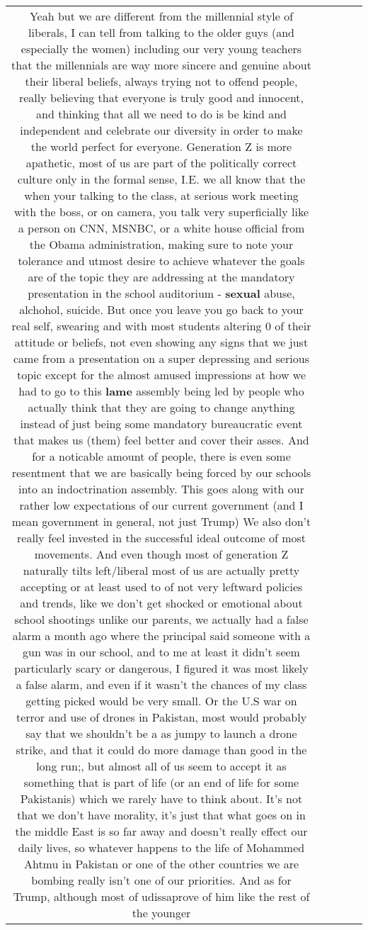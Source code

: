 \documentclass[11pt]{article}
\newlength\mylength
\begin{document}
\begin{center}
\begin{longtable}{|C{.65\mylength}|C{.30\mylength}|C{.12\mylength}|C{.12\mylength}|C{.12\mylength}|}
  \small Yeah but we are different from the millennial style of liberals, I can tell from talking to the older guys (and especially the women) including our very young teachers that the millennials are way more sincere and genuine about their liberal beliefs, always trying not to offend people, really believing that everyone is truly good and innocent, and thinking that all we need to do is be kind and independent and celebrate our diversity in order to make the world perfect for everyone. Generation Z is more apathetic, most of us are part of the politically correct culture only in the formal sense, I.E. we all know that the when your talking to the class, at serious work meeting with the boss, or on camera, you talk very superficially  like a person on CNN, MSNBC, or a white house official from the Obama administration, making sure to note your tolerance and utmost desire to achieve whatever the goals are of the topic they are addressing at the mandatory presentation in the school auditorium - \textbf{sexual} abuse, alchohol, suicide. But once you leave you go back to your real self, swearing and with most students altering 0 of their attitude or beliefs, not even showing any signs that we just came from a presentation on a super depressing and serious topic except for the almost amused impressions at how we had to go to this \textbf{lame} assembly being led by people who actually think that they are going to change anything instead of just being some mandatory bureaucratic event that makes us (them) feel better and cover their asses. And for a noticable amount of people, there is even some resentment that we are basically being forced by our schools into an indoctrination assembly. This goes along with our rather low expectations of our current government (and I mean government in general, not just Trump) We also don't really feel invested in the successful ideal outcome of most movements. And even though most of generation Z naturally tilts left/liberal most of us are actually pretty accepting or at least used to of not very leftward policies and trends, like we don't get shocked or emotional about school shootings unlike our parents, we actually had a false alarm a month ago where the principal said someone with a gun was in our school, and to me at least it didn't seem particularly scary or dangerous, I figured it was most likely a false alarm, and even if it wasn't the chances of my class getting picked would be very small. Or the U.S war on terror and use of drones in Pakistan, most would probably say that we shouldn't be a as jumpy to launch a drone strike, and that it could do more damage than good in the long run;,  but almost all of us seem to accept it as something that is part of life (or an end of life for some Pakistanis) which we rarely have to think about. It's not that we don't have morality, it's just that what goes on in the middle East is so far away and doesn't really effect our daily lives, so whatever happens to the life of Mohammed Ahtmu in Pakistan or one of the other countries we are bombing really isn't one of our priorities. And as for Trump, although most of udissaprove of him like the rest of the younger 
\end{longtable}
\end{center}
\end{document}

